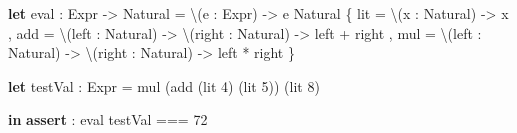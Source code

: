\documentclass[]{article}
\newenvironment{Shaded}{}{}
\newcommand{\CommentTok}[1]{\textcolor[rgb]{0.38,0.63,0.69}{\textit{#1}}}
\newcommand{\DecValTok}[1]{\textcolor[rgb]{0.25,0.63,0.44}{#1}}
\newcommand{\KeywordTok}[1]{\textcolor[rgb]{0.00,0.44,0.13}{\textbf{#1}}}
\newcommand{\NormalTok}[1]{#1}
\newcommand{\OperatorTok}[1]{\textcolor[rgb]{0.40,0.40,0.40}{#1}}
\begin{document}
\begin{Shaded}
\begin{Highlighting}[]
\KeywordTok{let}\CommentTok{ }\NormalTok{eval}\CommentTok{ }\NormalTok{:}\CommentTok{ }\NormalTok{Expr}\CommentTok{ }\OperatorTok{{-}\textgreater{}}\CommentTok{ }\NormalTok{Natural}
\CommentTok{      }\NormalTok{=}\CommentTok{ }\OperatorTok{\textbackslash{}}\NormalTok{(e}\CommentTok{ }\NormalTok{:}\CommentTok{ }\NormalTok{Expr)}\CommentTok{ }\OperatorTok{{-}\textgreater{}}
\CommentTok{          }\NormalTok{e}\CommentTok{ }\NormalTok{Natural}
\CommentTok{            }\NormalTok{\{}\CommentTok{ }\NormalTok{lit}\CommentTok{ }\NormalTok{=}\CommentTok{ }\OperatorTok{\textbackslash{}}\NormalTok{(x}\CommentTok{ }\NormalTok{:}\CommentTok{ }\NormalTok{Natural)}\CommentTok{ }\OperatorTok{{-}\textgreater{}}\CommentTok{ }\NormalTok{x}
\CommentTok{            }\NormalTok{,}\CommentTok{ }\NormalTok{add}\CommentTok{ }\NormalTok{=}\CommentTok{ }\OperatorTok{\textbackslash{}}\NormalTok{(left}\CommentTok{ }\NormalTok{:}\CommentTok{ }\NormalTok{Natural)}\CommentTok{ }\OperatorTok{{-}\textgreater{}}\CommentTok{ }\OperatorTok{\textbackslash{}}\NormalTok{(right}\CommentTok{ }\NormalTok{:}\CommentTok{ }\NormalTok{Natural)}\CommentTok{ }\OperatorTok{{-}\textgreater{}}\CommentTok{ }\NormalTok{left}\CommentTok{ }\NormalTok{+}\CommentTok{ }\NormalTok{right}
\CommentTok{            }\NormalTok{,}\CommentTok{ }\NormalTok{mul}\CommentTok{ }\NormalTok{=}\CommentTok{ }\OperatorTok{\textbackslash{}}\NormalTok{(left}\CommentTok{ }\NormalTok{:}\CommentTok{ }\NormalTok{Natural)}\CommentTok{ }\OperatorTok{{-}\textgreater{}}\CommentTok{ }\OperatorTok{\textbackslash{}}\NormalTok{(right}\CommentTok{ }\NormalTok{:}\CommentTok{ }\NormalTok{Natural)}\CommentTok{ }\OperatorTok{{-}\textgreater{}}\CommentTok{ }\NormalTok{left}\CommentTok{ }\NormalTok{*}\CommentTok{ }\NormalTok{right}
\CommentTok{            }\NormalTok{\}}

\KeywordTok{let}\CommentTok{ }\NormalTok{testVal}\CommentTok{ }\NormalTok{:}\CommentTok{ }\NormalTok{Expr}
\CommentTok{      }\NormalTok{=}\CommentTok{ }\NormalTok{mul}\CommentTok{ }\NormalTok{(add}\CommentTok{ }\NormalTok{(lit}\CommentTok{ }\DecValTok{4}\NormalTok{)}\CommentTok{ }\NormalTok{(lit}\CommentTok{ }\DecValTok{5}\NormalTok{))}\CommentTok{ }\NormalTok{(lit}\CommentTok{ }\DecValTok{8}\NormalTok{)}

\KeywordTok{in}\CommentTok{  }\KeywordTok{assert}\CommentTok{ }\NormalTok{:}\CommentTok{ }\NormalTok{eval}\CommentTok{ }\NormalTok{testVal}\CommentTok{ }\OperatorTok{===}\CommentTok{ }\DecValTok{72}
\end{Highlighting}
\end{Shaded}
\end{document}
